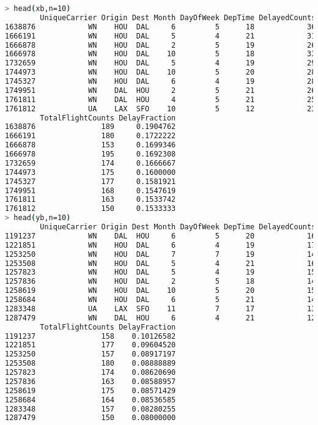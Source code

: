 \documentclass{article}\usepackage[]{graphicx}\usepackage[]{color}
\begin{document}
\begin{lstlisting}[language=bash,caption={Timing for all\_preprocess.sh}]
> head(xb,n=10)
        UniqueCarrier Origin Dest Month DayOfWeek DepTime DelayedCounts
1638876            WN    HOU  DAL     6         5      18            36
1666191            WN    HOU  DAL     5         4      21            31
1666878            WN    HOU  DAL     2         5      19            26
1666978            WN    HOU  DAL    10         5      18            33
1732659            WN    HOU  DAL     5         4      19            29
1744973            WN    HOU  DAL    10         5      20            28
1745327            WN    HOU  DAL     6         4      19            28
1749951            WN    DAL  HOU     2         5      21            26
1761811            WN    DAL  HOU     4         5      21            25
1761812            UA    LAX  SFO    10         5      12            23
        TotalFlightCounts DelayFraction
1638876               189     0.1904762
1666191               180     0.1722222
1666878               153     0.1699346
1666978               195     0.1692308
1732659               174     0.1666667
1744973               175     0.1600000
1745327               177     0.1581921
1749951               168     0.1547619
1761811               163     0.1533742
1761812               150     0.1533333
> head(yb,n=10)
        UniqueCarrier Origin Dest Month DayOfWeek DepTime DelayedCounts
1191237            WN    DAL  HOU     6         5      20            16
1221851            WN    HOU  DAL     6         4      19            17
1253250            WN    HOU  DAL     7         7      19            14
1253508            WN    HOU  DAL     5         4      21            16
1257823            WN    HOU  DAL     5         4      19            15
1257836            WN    HOU  DAL     2         5      18            14
1258619            WN    HOU  DAL    10         5      20            15
1258684            WN    HOU  DAL     6         5      21            14
1283348            UA    LAX  SFO    11         7      17            13
1287479            WN    DAL  HOU     6         4      21            12
        TotalFlightCounts DelayFraction
1191237               158    0.10126582
1221851               177    0.09604520
1253250               157    0.08917197
1253508               180    0.08888889
1257823               174    0.08620690
1257836               163    0.08588957
1258619               175    0.08571429
1258684               164    0.08536585
1283348               157    0.08280255
1287479               150    0.08000000

\end{lstlisting}
\end{document}
